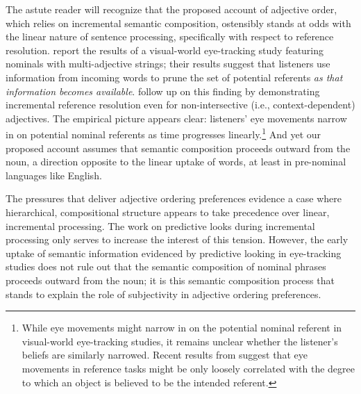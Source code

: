 \documentclass[preprint,authoryear]{elsarticle}\frenchspacing
\newcommand{\jd}[1]{\textcolor{Blue}{[jd: #1]}}
\newcommand{\gcs}[1]{\textcolor{blue}{[gcs: #1]}}
\begin{document}
The astute reader will recognize that the proposed account of adjective order, which relies on incremental semantic composition, ostensibly stands at odds with the linear nature of sentence processing, specifically with respect to reference resolution. \cite{eberhardetal1995} report the results of a visual-world eye-tracking study featuring nominals with multi-adjective strings; their results suggest that listeners use information from incoming words to prune the set of potential referents \emph{as that information becomes available}. \cite{sedivyetal1999} follow up on this finding by demonstrating incremental reference resolution even for non-intersective (i.e., context-dependent) adjectives. The empirical picture appears clear: listeners' eye movements narrow in on potential nominal referents as time progresses linearly.\footnote{While eye movements might narrow in on the potential nominal referent in visual-world eye-tracking studies, it remains unclear whether the listener's beliefs are similarly narrowed. Recent results from \cite{qingetal2018} suggest that eye movements in reference tasks might be only loosely correlated with the degree to which an object is believed to be the intended referent. %
} 
And yet our proposed account assumes that semantic composition proceeds outward from the noun, a direction opposite to the linear uptake of words, at least in pre-nominal languages like English.

The pressures that deliver adjective ordering preferences evidence a case where hierarchical, compositional structure appears to take precedence over linear, incremental processing. The work on predictive looks during incremental processing only serves to increase the interest of this tension. However, the early uptake of semantic information evidenced by predictive looking in eye-tracking studies does not rule out that the semantic composition of nominal phrases proceeds outward from the noun; it is this semantic composition process that stands to explain the role of subjectivity in adjective ordering preferences. 
\end{document}
